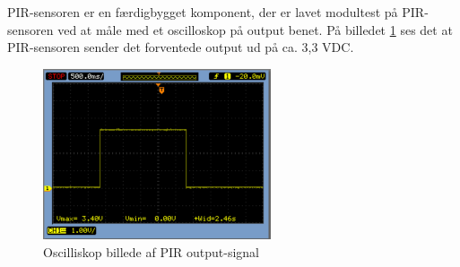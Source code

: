 PIR-sensoren er en færdigbygget komponent, der er lavet modultest på PIR-sensoren ved at måle med et oscilloskop på output benet. På billedet \ref{lab:pir_sensor} ses det at PIR-sensoren sender det forventede output ud på ca. 3,3 VDC.    

\begin{figure}[htb]
\centering
\includegraphics[width=0.60\textwidth]{filer/pics/pir_sensor}
\caption{Oscilliskop billede af PIR output-signal}
\label{lab:pir_sensor}
\end{figure}


